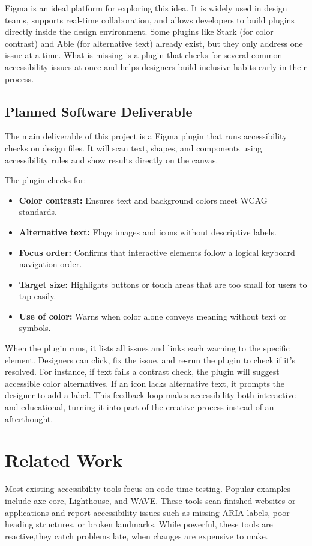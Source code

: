 \documentclass[12pt]{article}
\begin{document}
Figma is an ideal platform for exploring this idea. It is widely used in design teams, supports real-time
collaboration, and allows developers to build plugins directly inside the design environment. Some
plugins like Stark (for color contrast) and Able (for alternative text) already exist, but they only address
one issue at a time. What is missing is a plugin that checks for several common accessibility issues at
once and helps designers build inclusive habits early in their process.

\subsection{Planned Software Deliverable}
The main deliverable of this project is a Figma plugin that runs accessibility checks on design files.
It will scan text, shapes, and components using accessibility rules and show results directly on the
canvas.

The plugin checks for:
\begin{itemize}
    \item \textbf{Color contrast:} Ensures text and background colors meet WCAG standards.
    \item \textbf{Alternative text:} Flags images and icons without descriptive labels.
    \item \textbf{Focus order:} Confirms that interactive elements follow a logical keyboard navigation order.
    \item \textbf{Target size:} Highlights buttons or touch areas that are too small for users to tap easily.
    \item \textbf{Use of color:} Warns when color alone conveys meaning without text or symbols.
\end{itemize}

When the plugin runs, it lists all issues and links each warning to the specific element. Designers can
click, fix the issue, and re-run the plugin to check if it’s resolved. For instance, if text fails a contrast
check, the plugin will suggest accessible color alternatives. If an icon lacks alternative text, it prompts
the designer to add a label. This feedback loop makes accessibility both interactive and educational,
turning it into part of the creative process instead of an afterthought.

\section{Related Work}
Most existing accessibility tools focus on code-time testing. Popular examples include axe-core,
Lighthouse, and WAVE. These tools scan finished websites or applications and report accessibility
issues such as missing ARIA labels, poor heading structures, or broken landmarks. While powerful,
these tools are reactive,they catch problems late, when changes are expensive to make.
\end{document}
